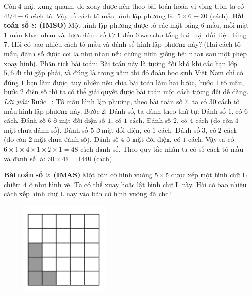 \begin{multicols}{2}
	\vskip 0.1cm
	Còn $4$ mặt xung quanh, do xoay được nên theo bài toán hoán vị vòng tròn ta có $4!/4=6$ cách tô.
	\vskip 0.1cm
	Vậy số cách tô mầu hình lập phương là: $5\times 6=30$ (cách).
	\vskip 0.1cm
	\textbf{Bài toán số $8$: (IMSO)}
	\vskip 0.1cm
	Một hình lập phương được tô các mặt bằng $6$ mầu, mỗi mặt $1$ mầu khác nhau và được đánh số từ $1$ đến $6$ sao cho tổng hai mặt đối diện bằng $7$. Hỏi có bao nhiêu cách tô mầu và đánh số hình lập phương này? (Hai cách tô mầu, đánh số được coi là như nhau nếu chúng nhìn giống hệt nhau sau một phép xoay hình). 
	\vskip 0.1cm
	Phân tích bài toán: Bài toán này là tương đối khó khi các bạn lớp $5,6$ đi thi gặp phải, và đúng là trong năm thi đó đoàn học sinh Việt Nam chỉ có đúng $1$ bạn làm được, tuy nhiên nếu chia bài toán làm hai bước, bước $1$ tô mầu, bước $2$ điền số thì ta có thể giải quyết được bài toán một cách tương đối dễ dàng.
	\vskip 0.1cm
	\textit{Lời giải:}
	\vskip 0.1cm 
	Bước $1$: Tô mầu hình lập phương, theo bài toán số $7$, ta có $30$ cách tô mầu hình lập phương này.
	\vskip 0.1cm
	Bước $2$: Đánh số, ta đánh theo thứ tự:
	\vskip 0.1cm
	Đánh số $1$, có $6$ cách. Đánh số $6$ ở mặt đối diện số $1$, có $1$ cách.
	\vskip 0.1cm
	Đánh số $2$, có $4$ cách (do còn $4$ mặt chưa đánh số). Đánh số $5$ ở mặt đối diện, có $1$ cách.
	\vskip 0.1cm
	Đánh số $3$, có $2$ cách (do còn $2$ mặt chưa đánh số). Đánh số $4$ ở mặt đối diện, có $1$ cách.
	\vskip 0.1cm
	Vậy ta có $6\times1\times4\times1\times2\times1=48$ cách đánh số.
	\vskip 0.1cm
	Theo quy tắc nhân ta có số cách tô mầu và đánh số là: $30\times 48=1440$ (cách).
	\vskip 0.1cm
	\begin{multicols}{2}
		\textbf{Bài toán số $9$: (IMAS)}
		\vskip 0.1cm
		Một bàn cờ hình vuông $5\times 5$ được xếp một hình chữ L chiếm $4$ ô như hình vẽ. Ta có thể xuay hoặc lật hình chữ L này. Hỏi có bao nhiêu cách xếp hình chữ L này vào bàn cờ hình vuông đã cho?
		\begin{figure}[H]
			\centering
			\vspace*{-5pt}
			\captionsetup{labelformat=empty, justification=centering}
			\includegraphics[width=0.4\textwidth]{_13}

\end{figure}
\end{multicols}
\end{multicols}

